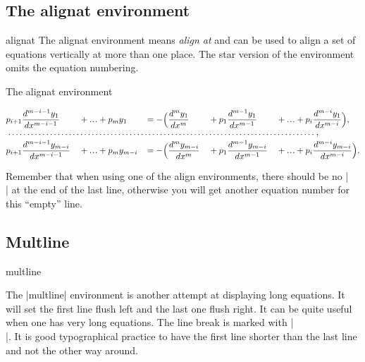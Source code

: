 \subsection{The alignat environment}

\begin{docEnvironment}{alignat}{}
The alignat environment means \emph{align at} and can be used to align a set of equations vertically at more than one place. The star version of the environment omits the equation numbering.
\end{docEnvironment}


\begin{texexample}{The alignat environment}{}
\renewcommand{\dotsb}{\ldots}			%
\renewcommand{\dotsbsmall}{\ldot\!\ldot\!\ldot}
\renewcommand{\ldot}{\mathbin{.}}			%
\renewcommand{\nobf}[1]{\no \textbf{#1}}	

\begin{alignat*}{5}
  &p_{i+1}\dfrac{d^{m-i-1}y_1}{dx^{m-i-1}} &&+ \dotsbsmall +p_{m}y_1
  && = -\Big(\dfrac{d^{m}y_1}{dx^{m}} &&+p_1\dfrac{d^{m-1}y_1}{dx^{m-1}}
  &&+ \dotsbsmall +p_{i}\dfrac{d^{m-i}y_1}{dx^{m-i}}\Big), \\
\multispan{10}{\makebox[36em]{\dotfill},}\\
 &p_{i+1}\dfrac{d^{m-i-1}y_{m-i}}{dx^{m-i-1}} &&+ \dotsbsmall +p_{m}y_{m-i}\!
 &&= -\Big(\dfrac{d^{m}y_{m-i}}{dx^{m}} &&+ p_1\dfrac{d^{m-1}y_{m-i}}{dx^{m-1}}
 &&+ \dotsbsmall +p_{i}\dfrac{d^{m-i}y_{m-i}}{dx^{m-i}}\Big).
\end{alignat*}
\end{texexample}



Remember that when using one of the align environments, there should be no |\\| at the end of the
last line, otherwise you will get another equation number for this ``empty''  line.


\subsection{Multline}

\begin{docEnvironment}{multline}{}
\end{docEnvironment}
The |multline| environment is another attempt at displaying long equations. It will set the first line flush left and the last one flush right. It can be quite useful when one has very long equations. The line break is marked with |\\|. It is good typographical practice to have the first line shorter than the last line and not the other way around.

